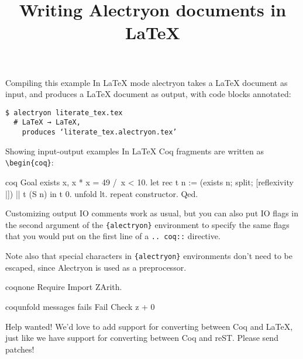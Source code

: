 \documentclass[10pt]{beamer}
\title{Writing Alectryon documents in LaTeX}
\begin{document}
\maketitle

\begin{frame}[fragile]{Compiling this example}
  In LaTeX mode alectryon takes a LaTeX document as input, and produces a LaTeX
  document as output, with code blocks annotated:

  \begin{verbatim}
$ alectryon literate_tex.tex
  # LaTeX → LaTeX,
    produces ‘literate_tex.alectryon.tex’
  \end{verbatim}
\end{frame}

\begin{frame}[fragile]{Showing input-output examples}
  In LaTeX Coq fragments are written as \verb|\begin{coq}|:

  \begin{alectryon}{coq}{}
  Goal exists x, x * x = 49 /\ x < 10.
    let rec t n :=
      (exists n; split; [reflexivity |]) || t (S n) in
    t 0.
    unfold lt.
    repeat constructor.
  Qed.
  \end{alectryon}
\end{frame}

\begin{frame}[fragile]{Customizing output}
  IO comments work as usual, but you can also put IO flags in the second argument of the \verb|{alectryon}| environment to specify the same flags that you would put on the first line of a \verb|.. coq::| directive.

  Note also that special characters in \verb|{alectryon}| environments don't need to be escaped, since Alectryon is used as a preprocessor.

  \begin{alectryon}{coq}{none}
  Require Import ZArith.
  \end{alectryon}

  \begin{alectryon}{coq}{unfold messages fails}
  Fail Check z + 0%
  \end{alectryon}
\end{frame}

\begin{frame}{Help wanted!}
  We'd love to add support for converting between Coq and LaTeX, just like we have support for converting between Coq and reST.  Please send patches!
\end{frame}
\end{document}
